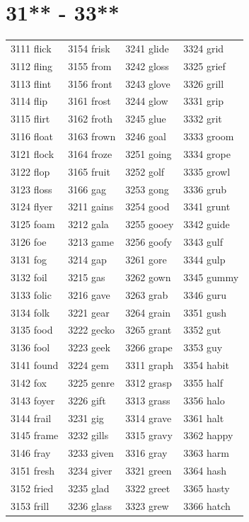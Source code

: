 \documentclass[12pt, oneside]{book}
\begin{document}
	\begin{table}[h]
		\centering
		\section*{31** - 33**}
		\begin{tabular}{l l l l}
			3111 flick & 3154 frisk & 3241 glide & 3324 grid\\
			3112 fling & 3155 from & 3242 gloss & 3325 grief\\
			3113 flint & 3156 front & 3243 glove & 3326 grill\\
			3114 flip & 3161 frost & 3244 glow & 3331 grip\\
			3115 flirt & 3162 froth & 3245 glue & 3332 grit\\
			3116 float & 3163 frown & 3246 goal & 3333 groom\\
			3121 flock & 3164 froze & 3251 going & 3334 grope\\
			3122 flop & 3165 fruit & 3252 golf & 3335 growl\\
			3123 floss & 3166 gag & 3253 gong & 3336 grub\\
			3124 flyer & 3211 gains & 3254 good & 3341 grunt\\
			3125 foam & 3212 gala & 3255 gooey & 3342 guide\\
			3126 foe & 3213 game & 3256 goofy & 3343 gulf\\
			3131 fog & 3214 gap & 3261 gore & 3344 gulp\\
			3132 foil & 3215 gas & 3262 gown & 3345 gummy\\
			3133 folic & 3216 gave & 3263 grab & 3346 guru\\
			3134 folk & 3221 gear & 3264 grain & 3351 gush\\
			3135 food & 3222 gecko & 3265 grant & 3352 gut\\
			3136 fool & 3223 geek & 3266 grape & 3353 guy\\
			3141 found & 3224 gem & 3311 graph & 3354 habit\\
			3142 fox & 3225 genre & 3312 grasp & 3355 half\\
			3143 foyer & 3226 gift & 3313 grass & 3356 halo\\
			3144 frail & 3231 gig & 3314 grave & 3361 halt\\
			3145 frame & 3232 gills & 3315 gravy & 3362 happy\\
			3146 fray & 3233 given & 3316 gray & 3363 harm\\
			3151 fresh & 3234 giver & 3321 green & 3364 hash\\
			3152 fried & 3235 glad & 3322 greet & 3365 hasty\\
			3153 frill & 3236 glass & 3323 grew & 3366 hatch\\
			
		\end{tabular}
	\end{table}
	
\end{document}
